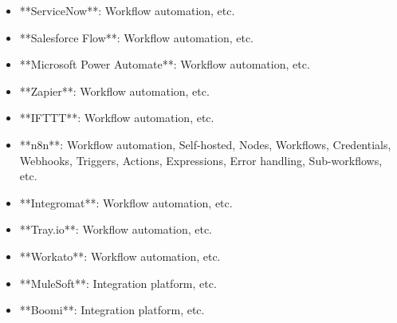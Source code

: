 \documentclass[11pt,a4paper]{article}
\begin{document}
\begin{itemize}
\item **ServiceNow**: Workflow automation, etc.
\end{itemize}

\begin{itemize}
\item **Salesforce Flow**: Workflow automation, etc.
\end{itemize}

\begin{itemize}
\item **Microsoft Power Automate**: Workflow automation, etc.
\end{itemize}

\begin{itemize}
\item **Zapier**: Workflow automation, etc.
\end{itemize}

\begin{itemize}
\item **IFTTT**: Workflow automation, etc.
\end{itemize}

\begin{itemize}
\item **n8n**: Workflow automation, Self-hosted, Nodes, Workflows, Credentials, Webhooks, Triggers, Actions, Expressions, Error handling, Sub-workflows, etc.
\end{itemize}

\begin{itemize}
\item **Integromat**: Workflow automation, etc.
\end{itemize}

\begin{itemize}
\item **Tray.io**: Workflow automation, etc.
\end{itemize}

\begin{itemize}
\item **Workato**: Workflow automation, etc.
\end{itemize}

\begin{itemize}
\item **MuleSoft**: Integration platform, etc.
\end{itemize}

\begin{itemize}
\item **Boomi**: Integration platform, etc.
\end{itemize}
\end{document}
